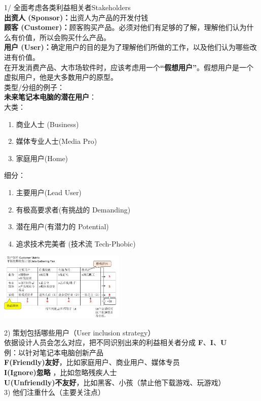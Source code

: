1/ 全面考虑各类利益相关者Stakeholders\\
\textbf{出资人 (Sponsor)：}出资人为产品的开发付钱\\
\textbf{顾客
(Customer)：}顾客购买产品。必须对他们有足够的了解，理解他们认为什么有价值，所以会购买什么产品。\\
\textbf{用户
(User)：}确定用户的目的是为了理解他们所做的工作，以及他们认为哪些改进有价值。\\
在开发消费产品、大市场软件时，应该考虑用一个\textbf{``假想用户''}。假想用户是一个虚拟用户，他是大多数用户的原型。\\
类型/分组的例子：\\
\textbf{未来笔记本电脑的潜在用户}：\\
大类：\\

\begin{enumerate}
\tightlist
\item
  商业人士 (Business)
\item
  媒体专业人士(Media Pro)
\item
  家庭用户(Home)
\end{enumerate}

细分：\\

\begin{enumerate}
\tightlist
\item
  主要用户(Lead User)
\item
  有极高要求者(有挑战的 Demanding)
\item
  潜在用户(有潜力的 Potential)
\item
  追求技术完美者 (技术流 Tech-Phobic)
\end{enumerate}


\includegraphics[width=6cm]{CustomerMatrixScreenshot_2022-12-16_180326.jpg}
 	
2) 策划包括哪些用户（User inclusion strategy）\\
依据设计人员会怎么对应，把不同识别出来的利益相关者分成
\textbf{F}、\textbf{I}、\textbf{U}\\
例：以针对笔记本电脑创新产品\\
\textbf{F(Friendly)友好}，比如家庭用户、商业用户、媒体专员\\
\textbf{I(Ignore)忽略} ，比如忽略残疾人士\\
\textbf{U(Unfriendly)不友好}，比如黑客、小孩（禁止他下载游戏、玩游戏）\\	
3)  他们注重什么（主要关注点）

